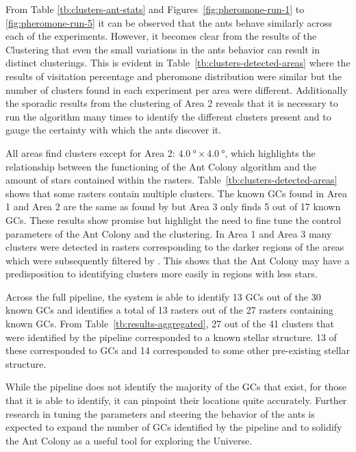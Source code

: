 From Table \ref{tb:clusters-ant-stats} and Figures~\ref{fig:pheromone-run-1} to \ref{fig:pheromone-run-5} it can be observed that the ants behave similarly across each of the experiments. However, it becomes clear from the results of the Clustering that even the small variations in the ants behavior can result in distinct clusterings. This is evident in Table~\ref{tb:clusters-detected-areas} where the results of visitation percentage and pheromone distribution were similar but the number of clusters found in each experiment per area were different. Additionally the sporadic results from the clustering of Area 2 reveals that it is necessary to run the algorithm many times to identify the different clusters present and to gauge the certainty with which the ants discover it.

All areas find clusters except for Area 2: $\SI{4.0}{\degree}\times\SI{4.0}{\degree}$, which highlights the relationship between the functioning of the Ant Colony algorithm and the amount of stars contained within the rasters. Table~\ref{tb:clusters-detected-areas} shows that some rasters contain multiple clusters. The known GCs found in Area 1 and Area 2 are the same as found by \blobdog{} but Area 3 only finds 5 out of 17 known GCs. These results show promise but highlight the need to fine tune the control parameters of the Ant Colony and the clustering. In Area 1 and Area 3 many clusters were detected in rasters corresponding to the darker regions of the areas which were subsequently filtered by \blobdog{}. This shows that the Ant Colony may have a predisposition to identifying clusters more easily in regions with less stars.

Across the full pipeline, the system is able to identify 13 GCs out of the 30 known GCs and identifies a total of 13 rasters out of the 27 rasters containing known GCs. From Table~\ref{tb:results-aggregated}, 27 out of the 41 clusters that were identified by the pipeline corresponded to a known stellar structure. 13 of these corresponded to GCs and 14 corresponded to some other pre-existing stellar structure.

While the pipeline does not identify the majority of the GCs that exist, for those that it is able to identify, it can pinpoint their locations quite accurately. Further research in tuning the parameters and steering the behavior of the ants is expected to expand the number of GCs identified by the pipeline and to solidify the Ant Colony as a useful tool for exploring the Universe.
